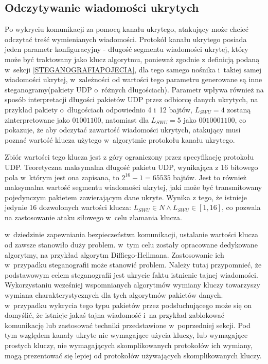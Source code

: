 \documentclass[a4paper, twoside, 12pt]{report}
\begin{document}
       \subsection{Odczytywanie wiadomości ukrytych}
       Po wykryciu komunikacji za pomocą kanału ukrytego, atakujący może chcieć
       odczytać treść wymienianych wiadomości. Protokół kanału ukrytego posiada
       jeden parametr konfiguracyjny - długość segmentu wiadomości ukrytej, który
       może być traktowany jako klucz algorytmu, ponieważ zgodnie z definicją podaną
       w~sekcji \ref{STEGANOGRAFIAPOJECIA}, dla tego samego nośnika i~takiej samej
       wiadomości ukrytej, w~zależności od wartości tego parametru generowane są
       inne steganogramy(pakiety UDP o~różnych długościach). Parametr wpływa również
       na sposób interpretacji długości pakietów UDP przez odbiorcę danych ukrytych,
       na przykład pakiety o~długościach odpowiednio 4 i~12 bajtów, \( L_{SWU} = 4 \)
       zostaną zinterpretowane jako \( 0100 1100 \), natomiast dla \( L_{SWU} = 5 \)
       jako \( 00100 01100 \), co pokazuje, że aby odczytać zawartość wiadomości
       ukrytych, atakujący musi poznać wartość klucza użytego w~algorytmie protokołu
       kanału ukrytego.

       Zbiór wartości tego
       klucza jest z góry ograniczony przez specyfikację protokołu UDP. Teoretyczna
       maksymalna długość pakietu UDP, wynikająca z 16 bitowego pola w~którym jest
       ona zapisana, to \(2^{16} - 1 = 65535\) bajtów. Jest to również maksymalna
       wartość segmentu wiadomości ukrytej, jaki może być transmitowany pojedynczym
       pakietem zawierającym dane ukryte. Wynika z tego, że istnieje jedynie 16
       dozwolonych wartości klucza: \( L_{SWU} \in N \land L_{SWU} \in [1, 16] \),
       co pozwala na zastosowanie ataku siłowego w~celu złamania klucza.

       w~dziedzinie zapewniania bezpieczeństwa komunikacji, ustalanie wartości
       klucza od zawsze stanowiło duży problem. w~tym celu zostały opracowane
       dedykowane algorytmy, na przykład algorytm Diffiego-Hellmana. Zastosowanie
       ich w~przypadku steganografii może stanowić problem. Należy tutaj przypomnieć,
       że podstawowym celem steganografii jest ukrycie faktu istnienie tajnej wiadomości.
       Wykorzystaniu wcześniej wspomnianych algorytmów wymiany kluczy towarzyszy
       wymiana charakterystycznych dla tych algorytmów pakietów danych. w~przypadku
       wykrycia tego typu pakietów przez podsłuchującego może się on domyślić,
       że istnieje jakaś tajna wiadomość i~na przykład zablokować komunikację lub
       zastosować techniki przedstawione w~poprzedniej sekcji. Pod tym względem
       kanały ukryte nie wymagające użycia kluczy, lub wymagające prostych kluczy,
       nie wymagających skomplikowanych protokołów ich wymiany, mogą prezentować
       się lepiej od protokołów używających skomplikowanych kluczy.
\end{document}
